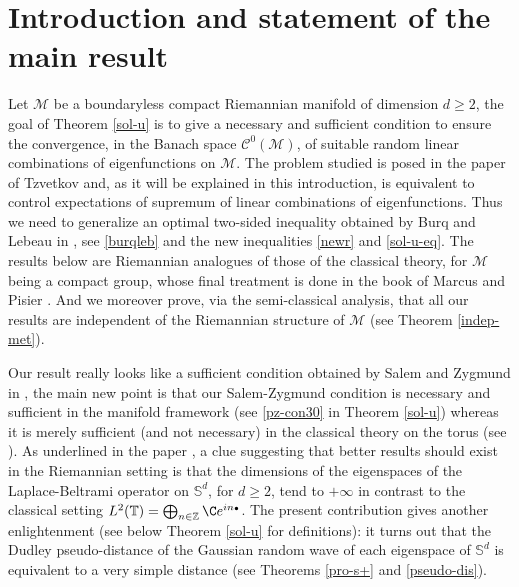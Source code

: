 \documentclass[JEP,XML,SOM,Unicode,NoEqCountersInSection,published]{cedram}
\newcommand{\sbullet}{{\scriptscriptstyle\bullet}}
\theoremstyle{theorem}
\theoremstyle{definition}
\newcommand\Z{\mathbb{Z}}
\newcommand\CC{\mathcal{C}}
\newcommand\bbS{\mathbb{S}}
\begin{document}
\maketitle
\vspace*{-\baselineskip}
\tableofcontents


\vspace*{-3\baselineskip}\mbox{}
\section{Introduction and statement of the main result}
Let $\mathcal{M}$ be a boundaryless compact Riemannian manifold of dimension $d\geq 2$, the goal of Theorem \ref{sol-u} is to give a necessary and sufficient condition to ensure the convergence, in the Banach space $\CC^0(\mathcal{M})$, of suitable random linear combinations of eigenfunctions on $\mathcal{M}$. The problem studied is posed in the paper of Tzvetkov \cite[p.\,XV]{Tzvetkov4} and, as it will be explained in this introduction, is equivalent to control expectations of supremum of linear combinations of eigenfunctions. Thus we need to generalize an optimal two-sided inequality obtained by Burq and Lebeau in \cite{burq-lebeau,burq-lebeau2}, see \eqref{burqleb} and the new inequalities \eqref{newr} and \eqref{sol-u-eq}.
The results below are Riemannian analogues of those of the classical theory, for $\mathcal{M}$ being a compact group, whose final treatment is done in the book of Marcus and Pisier \cite{pisier1981}. And we moreover prove, via the semi-classical analysis, that all our results are independent of the Riemannian structure of $\mathcal{M}$ (see Theorem \ref{indep-met}).%

Our result really looks like a sufficient condition obtained by Salem and Zygmund in \cite[p.\,291]{salem1954}, the main new point is that our Salem-Zygmund condition is necessary and sufficient in the manifold framework (see \eqref{pz-con30} in Theorem \ref{sol-u}) whereas it is merely sufficient (and not necessary) in the classical theory on the torus (see \cite[p.\,292]{salem1954}). As underlined in the paper \cite{burq-lebeau}, a clue suggesting that better results should exist in the Riemannian setting is that the dimensions of the eigenspaces of the Laplace-Beltrami operator on $\bbS^d$, for $d\geq 2$, tend to $+\infty$ in contrast to the classical setting $L^2(\mathbb{T})=\bigoplus_{n\in \Z} \C e^{in\sbullet}$. The present contribution gives another enlightenment (see \hbox{below} Theorem \ref{sol-u} for definitions): it turns out that the Dudley pseudo-distance of the Gaussian random wave of each eigenspace of $\bbS^d$ is equivalent to a very simple distance (see Theorems \ref{pro-s+} and \ref{pseudo-dis}).
\end{document}
